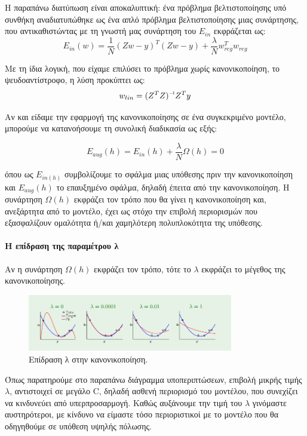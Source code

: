 \documentclass{article}
\newcommand\inv[1]{#1\raisebox{1.15ex}{$\scriptscriptstyle-\!1$}}
\begin{document}
 Η παραπάνω διατύπωση είναι αποκαλυπτική: ένα πρόβλημα βελτιστοποίησης υπό συνθήκη αναδιατυπώθηκε ως ένα απλό πρόβλημα βελτιστοποίησης μιας συνάρτησης, που αντικαθιστώντας με τη γνωστή μας συνάρτηση του $E_{in}$ εκφράζεται ως:
 $$E_{in}(w)=\frac{1}{N}(Zw-y)^T(Zw-y) + \frac{\lambda}{N} w^T_{reg} w_{reg} $$
 
 Με τη ίδια λογική, που είχαμε επιλύσει το πρόβλημα χωρίς κανονικοποίηση, το ψευδοαντίστροφο, η λύση προκύπτει ως:
 $$w_{lin}=\inv{ (Z^T Z)} Z^T y$$
 
 Αν και είδαμε την εφαρμογή της κανονικοποίησης σε ένα συγκεκριμένο μοντέλο, μπορούμε να κατανοήσουμε τη συνολική διαδικασία ως εξής:
 
 $$E_{aug}(h)= E_{in}(h) + \frac{\lambda}{N} \Omega(h)=0$$
 
όπου ως $E_{in(h)}$ συμβολίζουμε το σφάλμα μιας υπόθεσης πριν την κανονικοποίηση και $E_{aug}(h)$ το επαυξημένο σφάλμα, δηλαδή έπειτα από την κανονικοποίηση. Η συνάρτηση $\Omega(h)$ εκφράζει τον τρόπο που θα γίνει η κανονικοποίηση και, ανεξάρτητα από το μοντέλο, έχει ως στόχο την επιβολή περιορισμών που εξασφαλίζουν ομαλότητα ή/και χαμηλότερη πολυπλοκότητα της υπόθεσης.
\paragraph{Η επίδραση της παραμέτρου λ}
Αν η συνάρτηση $\Omega(h)$ εκφράζει τον τρόπο, τότε το $\lambda$ εκφράζει το μέγεθος της κανονικοποίησης.
 \begin{figure}[H]
	\centering			
    \includegraphics[width=0.8\textwidth]{l_reg.png}
    \caption[Επίδραση λ στην κανονικοποίηση]{Επίδραση λ στην κανονικοποίηση.}
 \end{figure}
 
 Όπως παρατηρούμε στο παραπάνω διάγραμμα υποπεριπτώσεων, επιβολή μικρής τιμής $\lambda$, αντιστοιχεί σε μεγάλο C, δηλαδή ασθενή περιορισμό του μοντέλου, που συνεχίζει να κινδυνεύει από υπερπροσαρμογή. Καθώς αυξάνουμε την τιμή του $\lambda$ γινόμαστε αυστηρότεροι, με κίνδυνο να είμαστε τόσο περιοριστικοί με το μοντέλο που θα οδηγηθούμε σε υπόθεση υψηλής πόλωσης.
\end{document}
